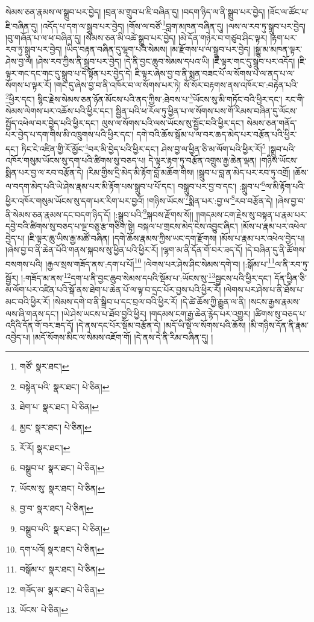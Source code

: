 སེམས་ཅན་རྣམས་ལ་སྒྲུབ་པར་བྱེད། །བྲན་མ་གྲུབ་པ་ཇི་བཞིན་དུ། །བདག་ཉིད་ལ་ནི་སྒྲུབ་པར་བྱེད། །ཟོང་ལ་ཚོང་པ་ཇི་བཞིན་དུ། །འདོད་པ་དག་ལ་སྒྲུབ་པར་བྱེད། །གོས་ལ་བཙོ་\footnote{གཙོ་  སྣར་ཐང་། }བླག་མཁན་བཞིན་དུ། །ལས་ལ་རབ་ཏུ་སྒྲུབ་པར་བྱེད། །བུ་གཞོན་པ་ལ་ཕ་བཞིན་དུ། །སེམས་ཅན་མི་འཚེ་སྒྲུབ་པར་བྱེད། །མེ་དོན་གཉེར་བ་གཙུབ་ཤིང་ལྟར། །རྟག་པར་རབ་ཏུ་སྒྲུབ་པར་བྱེད། །ཡིད་བརྟན་བཞིན་དུ་ལྷག་པའི་སེམས། །མ་རྫོགས་པ་ལ་སྒྲུབ་པར་བྱེད། །སྒྱུ་མ་མཁན་ལྟར་ཤེས་བྱ་ལ། །ཤེས་རབ་ཀྱིས་ནི་སྒྲུབ་པར་བྱེད། །དེ་ནི་བྱང་ཆུབ་སེམས་དཔའ་ཡི། །ཇི་ལྟར་གང་དུ་སྒྲུབ་པར་འདོད། །ཇི་ལྟར་གང་དང་གང་དུ་སྒྲུབ་པ་དེ་སྟོན་པར་བྱེད་དེ། ཇི་ལྟར་ཞེས་བྱ་བ་ནི་སྨན་བཟང་པོ་ལ་སོགས་པ་ལ་ནད་པ་ལ་སོགས་པ་ལྟར་རོ། །གང་དུ་ཞེས་བྱ་བ་ནི་འཁོར་བ་ལ་སོགས་པར་ཏེ། སོ་སོར་བརྟགས་ནས་འཁོར་བ་:བརྟེན་པའི་\footnote{བསྟེན་པའི་  སྣར་ཐང་།  པེ་ཅིན། }ཕྱིར་དང་། སྙིང་རྗེས་སེམས་ཅན་ཉོན་མོངས་པའི་ནད་ཀྱིས་:ཐེབས་པ་\footnote{ཐེག་པ་  སྣར་ཐང་།  པེ་ཅིན། }ཡོངས་སུ་མི་གཏོང་བའི་ཕྱིར་དང་། རང་གི་སེམས་ལེགས་པར་འཆོས་པའི་ཕྱིར་དང་། སྦྱིན་པའི་ཕ་རོལ་ཏུ་ཕྱིན་པ་ལ་སོགས་པས་གོ་རིམས་བཞིན་དུ་ལོངས་སྤྱོད་འཕེལ་བར་བྱེད་པའི་ཕྱིར་དང་། ལུས་ལ་སོགས་པའི་ལས་ཡོངས་སུ་སྦྱོང་བའི་ཕྱིར་དང་། སེམས་ཅན་གནོད་པར་བྱེད་པ་དག་གིས་མི་འཁྲུགས་པའི་ཕྱིར་དང་། དགེ་བའི་ཆོས་སྒོམ་པ་ལ་བར་ཆད་མེད་པར་བརྩོན་པའི་ཕྱིར་དང་། ཏིང་ངེ་འཛིན་གྱི་རོ་མྱོང་\footnote{མྱང་  སྣར་ཐང་།  པེ་ཅིན། }བར་མི་བྱེད་པའི་ཕྱིར་དང་། ཤེས་བྱ་ལ་ཕྱིན་ཅི་མ་ལོག་པའི་ཕྱིར་རོ།\footnote{རོ་རོ།  སྣར་ཐང་། } །སྒྲུབ་པའི་འཁོར་གསུམ་ཡོངས་སུ་དག་པའི་ཚིགས་སུ་བཅད་པ། དེ་ལྟར་རྟག་ཏུ་བརྩོན་འགྲུས་རྒྱ་ཆེན་ལྡན། །གཉིས་ཡོངས་སྨིན་པར་བྱ་ལ་རབ་བརྩོན་དེ། །རིམ་གྱིས་དྲི་མེད་མི་རྟོག་བློ་མཆོག་གིས། །སྒྲུབ་པ་བླ་ན་མེད་པར་རབ་ཏུ་འགྲོ། །ཆོས་ལ་བདག་མེད་པའི་ཡེ་ཤེས་རྣམ་པར་མི་རྟོག་པས་སྒྲུབ་པ་པོ་དང་། བསྒྲུབ་པར་བྱ་བ་དང་། :སྒྲུབ་པ་\footnote{བསྒྲུབ་པ་  སྣར་ཐང་།  པེ་ཅིན། }ལ་མི་རྟོག་པའི་ཕྱིར་འཁོར་གསུམ་ཡོངས་སུ་དག་པར་རིག་པར་བྱའོ། །གཉིས་ཡོངས་\footnote{ཡོངས་སུ་  སྣར་ཐང་།  པེ་ཅིན། }སྨིན་པར་:བྱ་ལ་\footnote{བྱ་བ་  སྣར་ཐང་།  པེ་ཅིན། }རབ་བརྩོན་དེ། །ཞེས་བྱ་བ་ནི་སེམས་ཅན་རྣམས་དང་བདག་ཉིད་དོ། །:སྒྲུབ་པའི་\footnote{བསྒྲུབ་པའི་  སྣར་ཐང་།  པེ་ཅིན། }སྐབས་རྫོགས་སོ།། །།གདམས་ངག་རྗེས་སུ་བསྟན་པ་རྣམ་པར་དབྱེ་བའི་ཚིགས་སུ་བཅད་པ་ལྔ་བཅུ་རྩ་གཅིག་སྟེ། བསྐལ་པ་གྲངས་མེད་ངེས་འབྱུང་ཞིང་། །མོས་པ་རྣམ་པར་འཕེལ་བྱེད་པ། །ཇི་ལྟར་ཆུ་ཡིས་རྒྱ་མཚོ་བཞིན། །དགེ་ཆོས་རྣམས་ཀྱིས་ཡང་དག་རྫོགས། །མོས་པ་རྣམ་པར་འཕེལ་བྱེད་པ། །ཞེས་བྱ་བ་ནི་ཆེན་པོའི་གནས་སྐབས་སུ་ཕྱིན་པའི་ཕྱིར་རོ། །ལྷག་མ་ནི་དོན་གོ་བར་ཟད་དོ། །དེ་བཞིན་དུ་ནི་ཚོགས་བསགས་པའི། །རྒྱལ་སྲས་གཟོད་ནས་:དག་པ་པོ།\footnote{དག་པའོ།  སྣར་ཐང་།  པེ་ཅིན། } །ལེགས་པར་ཤེས་ཤིང་སེམས་དགེ་བ། །:སྒོམ་པ་\footnote{བསྒོམ་པ་  སྣར་ཐང་།  པེ་ཅིན། }ལ་ནི་རབ་ཏུ་སྦྱོར། །:གཟོད་མ་ནས་\footnote{གཟོད་མ་  སྣར་ཐང་།  པེ་ཅིན། }དག་པ་ནི་བྱང་ཆུབ་སེམས་དཔའི་སྡོམ་པ་:ཡོངས་སུ་\footnote{ཡོངས་  པེ་ཅིན། }སྦྱངས་པའི་ཕྱིར་དང་། དོན་ཕྱིན་ཅི་མ་ལོག་པར་འཛིན་པའི་སྒོ་ནས་ཐེག་པ་ཆེན་པོ་ལ་ལྟ་བ་དྲང་པོར་བྱས་པའི་ཕྱིར་རོ། །ལེགས་པར་ཤེས་པ་ནི་ཐོས་པ་མང་བའི་ཕྱིར་རོ། །སེམས་དགེ་བ་ནི་སྒྲིབ་པ་དང་བྲལ་བའི་ཕྱིར་རོ། །དེ་ཚེ་ཆོས་ཀྱི་རྒྱུན་ལ་ནི། །སངས་རྒྱས་རྣམས་ལས་ཞི་གནས་དང་། །ཡེ་ཤེས་ཡངས་པ་ཐོབ་བྱའི་ཕྱིར། །གདམས་ངག་རྒྱ་ཆེན་རྙེད་པར་འགྱུར། །ཚིགས་སུ་བཅད་པ་འདིའི་དོན་གོ་བར་ཟད་དོ། །དེ་ནས་དང་པོར་སྡོམ་བརྩོན་དེ། །མདོ་ཡི་སྡེ་ལ་སོགས་པའི་ཆོས། །མི་གཉིས་དོན་ནི་རྣམ་འབྱེད་པ། །མདོ་སོགས་མིང་ལ་སེམས་འཇོག་གོ། །དེ་ནས་དེ་ནི་རིམ་བཞིན་དུ། །
